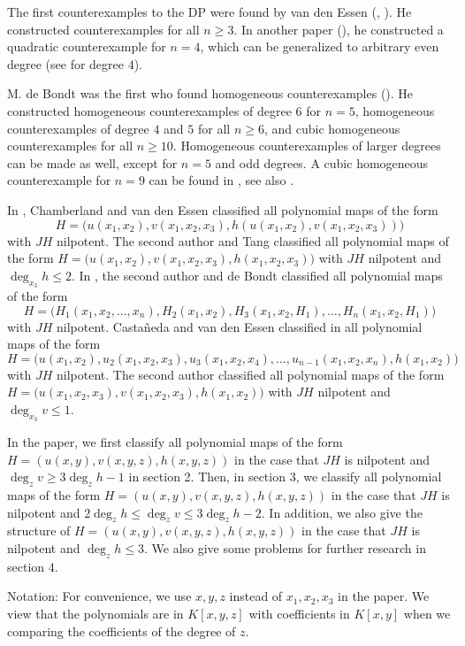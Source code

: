 \documentclass[12pt, twoside, leqno]{article}
\theoremstyle{definition}
\numberwithin{equation}{section}
\begin{document}
The first counterexamples to the DP were found by
van den Essen (\cite{9}, \cite[Theorem 7.1.7 (ii)]{3}). He
constructed counterexamples for all $n \geq 3$. In another paper
(\cite{E}), he constructed a quadratic counterexample for $n = 4$, which can be
generalized to arbitrary even degree (see \cite[Example 8.4.4]{3} for degree $4$).

 M. de Bondt was the
first who found homogeneous counterexamples (\cite{10}). He
constructed homogeneous counterexamples of degree $6$
for $n = 5$, homogeneous counterexamples of degree $4$ and $5$
for all $n \geq 6$, and cubic homogeneous counterexamples for all $n \geq 10$.
Homogeneous counterexamples of larger degrees can be made as well,
except for $n = 5$ and odd degrees. A cubic homogeneous counterexample
for $n = 9$ can be found in \cite{SFGZ}, see also \cite[Section 4.2]{HKM}.

In \cite{18}, Chamberland and van den Essen classified
all polynomial maps of the form
$$H=\big(u(x_1,x_2),v(x_1,x_2,x_3),h(u(x_1,x_2),v(x_1,x_2,x_3))\big)$$
with $JH$ nilpotent. The second author and Tang \cite{13} classified
all polynomial maps of the form
$H=\big(u(x_1,x_2),v(x_1,x_2,x_3),h(x_1,x_2,x_3)\big)$ with $JH$ nilpotent and $\deg_{x_3}h\leq 2$. In \cite{14}, the second author and de Bondt classified all polynomial maps
of the form
$$H=\big(H_1(x_1,x_2,\ldots,x_n),H_2(x_1,x_2),H_3(x_1,x_2,H_1),\ldots,H_n(x_1,x_2,H_1)\big)$$
with $JH$ nilpotent.
Casta\~{n}eda and van den Essen classified in \cite{CE} all polynomial maps
of the form
$$H=\big(u(x_1,x_2),u_2(x_1,x_2,x_3),u_3(x_1,x_2,x_4),\ldots,u_{n-1}(x_1,x_2,x_n),
h(x_1,x_2)\big)$$ with $JH$ nilpotent. The second author \cite{11} classified
all polynomial maps of the form
$H=\big(u(x_1,x_2,x_3),v(x_1,x_2,x_3),h(x_1,x_2)\big)$ with $JH$ nilpotent and $\deg_{x_3}v\leq 1$.

In the paper, we first classify all polynomial maps of the form
$H=(u(x,y),\allowbreak v(x,y,z), h(x,y,z))$ in the case that $JH$ is nilpotent and $\deg_zv\geq 3\deg_zh-1$ in section 2. Then, in section
3, we classify all polynomial maps of the form
$H=(u(x,y),\allowbreak v(x,y,z), h(x,y,z))$ in the case that $JH$ is nilpotent and $2\deg_zh\leq\deg_zv\leq 3\deg_zh-2$. In addition, we also give the structure of $H=(u(x,y),\allowbreak v(x,y,z), h(x,y,z))$ in the case that $JH$ is nilpotent and $\deg_zh\leq 3$. We also give some problems for further research in section 4.

Notation: For convenience, we use $x,y,z$ instead of $x_1,x_2,x_3$ in the paper. We view that the polynomials are in $K[x,y,z]$ with coefficients in $K[x,y]$ when we comparing the coefficients of the degree of $z$.
\end{document}
